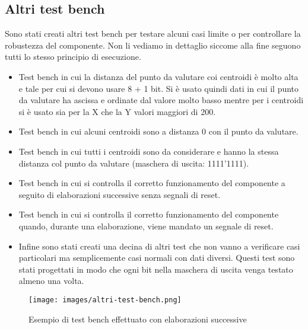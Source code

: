 \documentclass{article}
\begin{document}
\subsection{Altri test bench}
Sono stati creati altri test bench per testare alcuni casi limite o per controllare la robustezza del componente. Non li vediamo in dettaglio siccome alla fine seguono tutti lo stesso principio di esecuzione.
\begin{itemize}
    \item Test bench in cui la distanza del punto da valutare coi centroidi è molto alta e tale per cui si devono usare 8 + 1 bit. Si è usato quindi dati in cui il punto da valutare ha ascissa e ordinate dal valore molto basso mentre per i centroidi si è usato sia per la X che la Y valori maggiori di 200.
    \item Test bench in cui alcuni centroidi sono a distanza 0 con il punto da valutare.
    \item Test bench in cui tutti i centroidi sono da considerare e hanno la stessa distanza col punto da valutare (maschera di uscita: 1111'1111).
    \item Test bench in cui si controlla il corretto funzionamento del componente a seguito di elaborazioni successive senza segnali di reset.
    \item Test bench in cui si controlla il corretto funzionamento del componente quando, durante una elaborazione, viene mandato un segnale di reset.
    \item Infine sono stati creati una decina di altri test che non vanno a verificare casi particolari ma semplicemente casi normali con dati diversi. Questi test sono stati progettati in modo che ogni bit nella maschera di uscita venga testato almeno una volta.
\end{itemize}
\begin{figure}[H]
    \centering
    \caption{Esempio di test bench effettuato con elaborazioni successive}
    \texttt{[image: images/altri-test-bench.png]}
    \label{fig:altri-test-bench}
\end{figure}

\vspace{4mm}
\titlerule[0.4pt]


\end{document}
